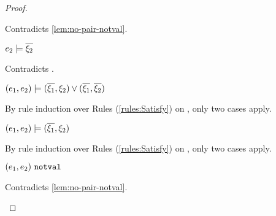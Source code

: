 \begin{proof}
\begin{byCases}
\begin{byCases}
\begin{byCases}
\begin{byCases}
\begin{byCases}
                    Contradicts \autoref{lem:no-pair-notval}.
                \item[\text{(\ref{rule:CSPair})}]
                    \begin{pfsteps*}
                    \item $e_2 \models \overline{\xi_2}$ 
                    \end{pfsteps*}
                    Contradicts .
                \end{byCases}
            \item[\text{(\ref{rule:CSOr2})}]
                \begin{pfsteps*}
                \item $(e_1 , e_2) \models (\overline{\xi_1} , \xi_2) \vee (\overline{\xi_1} , \overline{\xi_2})$  
                \end{pfsteps*}
                By rule induction over Rules (\ref{rules:Satisfy}) on , only two cases apply.
                \begin{byCases}
                \item[\text{(\ref{rule:CSOr1})}]
                    \begin{pfsteps*}
                    \item $(e_1 , e_2) \models (\overline{\xi_1} , \xi_2)$  
                    \end{pfsteps*}
                    By rule induction over Rules (\ref{rules:Satisfy}) on , only two cases apply.
                    \begin{byCases}
                    \item[\text{(\ref{rule:CSNotValPair})}]
                        \begin{pfsteps*}
                        \item $(e_1 , e_2) ~\mathtt{notval}$ 
                        \end{pfsteps*}
                        Contradicts \autoref{lem:no-pair-notval}.
                    \item[\text{(\ref{rule:CSPair})}]
                        \begin{pfsteps*}

\end{pfsteps*}
\end{byCases}
\end{byCases}
\end{byCases}
\end{byCases}
\end{byCases}
\end{byCases}
\end{proof}
